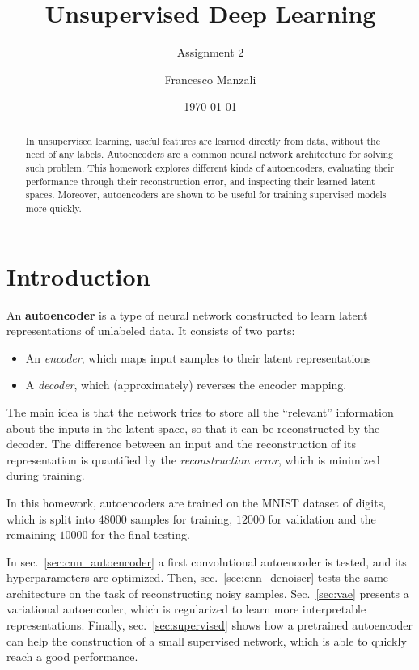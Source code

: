 \documentclass[11pt,a4paper]{scrartcl}
\newcommand{\exerciseNumber}{2}
\newcommand{\q}[1]{``#1''}
\begin{document}
\title{Unsupervised Deep Learning}
\subtitle{Assignment \exerciseNumber}
\author{\large Francesco Manzali}
\date{\large \today}
\maketitle
\thispagestyle{fancy}

\begin{abstract}
  In unsupervised learning, useful features are learned directly from data, without the need of any labels. Autoencoders are a common neural network architecture for solving such problem. This homework explores different kinds of autoencoders, evaluating their performance through their reconstruction error, and inspecting their learned latent spaces. Moreover, autoencoders are shown to be useful for training supervised models more quickly. 
\end{abstract}



\section*{Introduction}
An \textbf{autoencoder} is a type of neural network constructed to learn latent representations of unlabeled data. It consists of two parts:
\begin{itemize}
    \item An \textit{encoder}, which maps input samples to their latent representations
    \item A \textit{decoder}, which (approximately) reverses the encoder mapping.
\end{itemize}
The main idea is that the network tries to store all the \q{relevant} information about the inputs in the latent space, so that it can be reconstructed by the decoder. The difference between an input and the reconstruction of its representation is quantified by the \textit{reconstruction error}, which is minimized during training. 

\medskip

In this homework, autoencoders are trained on the MNIST dataset of digits, which is split into $\num{48000}$ samples for training, $\num{12000}$ for validation and the remaining $\num{10000}$ for the final testing. 

\medskip

In sec.~\ref{sec:cnn_autoencoder} a first convolutional autoencoder is tested, and its hyperparameters are optimized. Then, sec.~\ref{sec:cnn_denoiser} tests the same architecture on the task of reconstructing noisy samples. Sec.~\ref{sec:vae} presents a variational autoencoder, which is regularized to learn more interpretable representations. Finally, sec.~\ref{sec:supervised} shows how a pretrained autoencoder can help the construction of a small supervised network, which is able to quickly reach a good performance.
\end{document}
